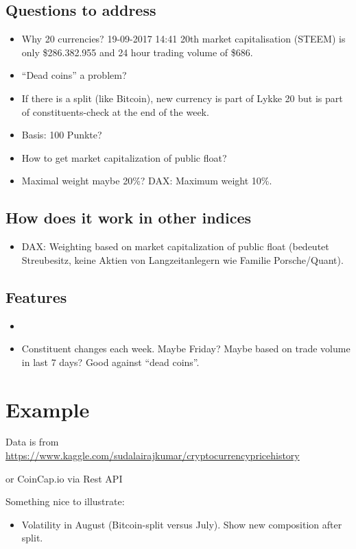 \documentclass[11pt]{article}
\begin{document}
\subsection{Questions to address}
\begin{itemize}
  \item Why 20 currencies? 19-09-2017 14:41 20th market capitalisation (STEEM) is only \$286.382.955	and 24 hour trading volume of \$686.
  \item ``Dead coins'' a problem?
  \item If there is a split (like Bitcoin), new currency is part of Lykke 20 but is part of constituents-check at the end of the week.
  \item Basis: 100 Punkte?
  \item How to get market capitalization of public float?
  \item Maximal weight maybe 20\%? DAX: Maximum weight 10\%.
\end{itemize}

\subsection{How does it work in other indices}

\begin{itemize}
  \item DAX: Weighting based on market capitalization of public float (bedeutet Streubesitz, keine Aktien von Langzeitanlegern  wie Familie Porsche/Quant).
\end{itemize}

\subsection{Features}

\begin{itemize}
  \item 
  \item Constituent changes each week. Maybe Friday? Maybe based on trade volume in last 7 days? Good against ``dead coins''.
\end{itemize}


\section{Example}

Data is from \href{https://www.kaggle.com/sudalairajkumar/cryptocurrencypricehistory}{https://www.kaggle.com/sudalairajkumar/cryptocurrencypricehistory}

or CoinCap.io via Rest API

Something nice to illustrate:
\begin{itemize}
  \item Volatility in August (Bitcoin-split versus July). Show new composition after split.
\end{itemize}



\end{document}
